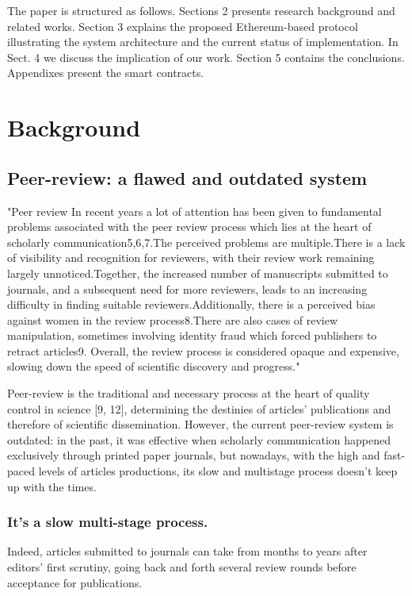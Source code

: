\documentclass[runningheads]{llncs}
\begin{document}
The paper is structured as follows. Sections 2 presents research background and related works. Section 3 explains the proposed Ethereum-based protocol illustrating the system architecture and the current status of implementation. In Sect. 4 we discuss the implication of our work. Section 5 contains the conclusions. Appendixes present the smart contracts. 

\section{Background}
\subsection{Peer-review: a flawed and outdated system}

"Peer review In recent years a lot of attention has been given to fundamental problems associated with the peer review process which lies at the heart of scholarly communication5,6,7.The perceived problems are multiple.There is a lack of visibility and recognition for reviewers, with their review work remaining largely unnoticed.Together, the increased number of manuscripts submitted to journals, and a subsequent need for more reviewers, leads to an increasing difficulty in finding suitable reviewers.Additionally, there is a perceived bias against women in the review process8.There are also cases of review manipulation, sometimes involving identity fraud which forced publishers to retract articles9. Overall, the review process is considered opaque and expensive, slowing down the speed of scientific discovery and progress."

Peer-review is the traditional and necessary process at the heart of quality control in science [9, 12], determining the destinies of articles’ publications and therefore of scientific dissemination. However, the current peer-review system is outdated: in the past, it was effective when scholarly communication happened exclusively through printed paper journals, but nowadays, with the high and fast-paced levels of articles productions, its slow and multistage process doesn’t keep up with the times.
\subsubsection{It's a slow multi-stage process.} Indeed, articles submitted to journals can take from months to years after editors’ first scrutiny, going back and forth several review rounds before acceptance for publications.
\end{document}
